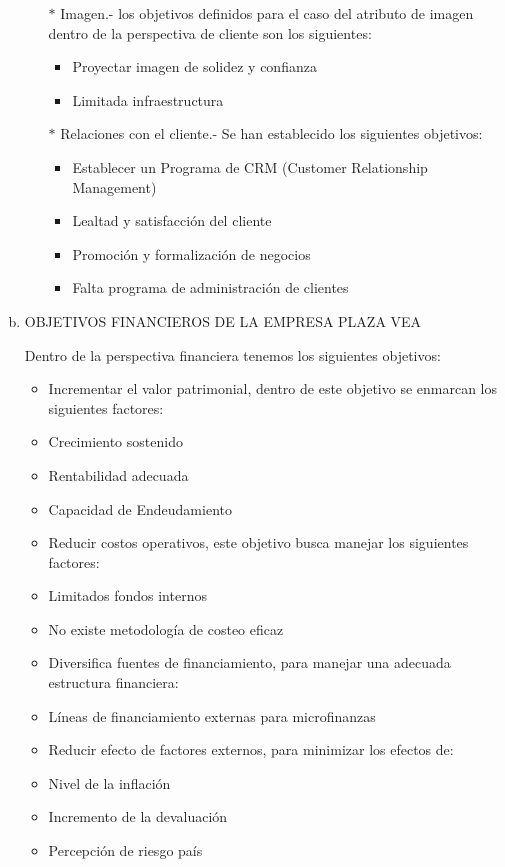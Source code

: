 \begin{enumerate}[a)]
\begin{itemize}
\begin{itemize}
				\end{itemize}


				\item[$*$] Imagen.- los objetivos definidos para el caso del atributo de imagen dentro de la perspectiva de cliente son los siguientes:
				\begin{itemize}

  				  \item Proyectar imagen de solidez y confianza
				\item Limitada infraestructura

				\end{itemize}

				\item[$*$] Relaciones con el cliente.- Se han establecido los siguientes objetivos:

				\begin{itemize}

  				  \item Establecer un Programa de CRM (Customer Relationship Management)
				\item Lealtad y satisfacción del cliente
				\item Promoción y formalización de negocios
				\item Falta programa de administración de clientes

				\end{itemize}

		\end{itemize}

	\item OBJETIVOS FINANCIEROS DE LA EMPRESA PLAZA VEA
		
	Dentro de la perspectiva financiera tenemos los siguientes objetivos:

			\begin{itemize}

  				  \item Incrementar el valor patrimonial, dentro de este objetivo se enmarcan los siguientes factores:
				\item Crecimiento sostenido
				\item Rentabilidad adecuada
				\item Capacidad de Endeudamiento
				\item Reducir costos operativos, este objetivo busca manejar los siguientes factores:
				\item Limitados fondos internos
				\item No existe metodología de costeo eficaz
				\item Diversifica fuentes de financiamiento, para manejar una adecuada estructura financiera:
				\item Líneas de financiamiento externas para microfinanzas
				\item Reducir efecto de factores externos, para minimizar los efectos de:
				\item Nivel de la inflación
				\item Incremento de la devaluación
				\item Percepción de riesgo país



\end{itemize}
\end{enumerate}
